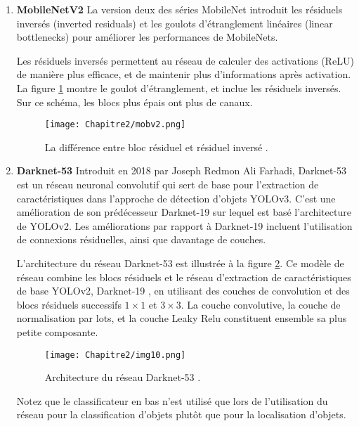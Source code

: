 \begin{enumerate}
\item \textbf{MobileNetV2 } \cite{mobilenetv2}
La version deux des séries MobileNet introduit les résiduels inversés (inverted residuals) et les goulots d'étranglement linéaires (linear bottlenecks) pour améliorer les performances de MobileNets. 

Les résiduels inversés permettent au réseau de calculer des activations (ReLU) de manière plus efficace, et de maintenir plus d’informations après activation. La figure \ref{mobv2} montre le goulot d'étranglement, et inclue les résiduels inversés. Sur ce schéma, les blocs plus épais ont plus de canaux. 

\begin{figure}[H]
\centering
  \texttt{[image: Chapitre2/mobv2.png]} 
   \caption{La différence entre bloc résiduel \cite{mobilenet}
et résiduel inversé \cite{mobilenetv2}.}
   \label{mobv2}
 \end{figure}
 
\item \textbf{Darknet-53} \cite{yolov3_paper}
Introduit en 2018 par Joseph Redmon Ali Farhadi, Darknet-53  est un réseau neuronal convolutif qui sert de base pour l'extraction de caractéristiques dans l'approche de détection d'objets YOLOv3. C'est une amélioration de son prédécesseur Darknet-19 sur lequel est basé l'architecture de YOLOv2.
Les améliorations par rapport à Darknet-19 incluent l'utilisation de connexions résiduelles, ainsi que davantage de couches.

L'architecture du réseau Darknet-53 est illustrée à la figure \ref{img10}. Ce modèle de réseau combine les blocs résiduels et le réseau d'extraction de caractéristiques de base YOLOv2, Darknet-19 \cite{yolov3_paper}, en utilisant des couches de convolution et des blocs résiduels successifs $1\times 1$ et $3\times 3$. La couche convolutive, la couche de normalisation par lots, et la couche Leaky Relu constituent ensemble sa plus petite composante.

           \begin{figure}[H]
                \centering
                \texttt{[image: Chapitre2/img10.png]}
                \caption{Architecture du réseau Darknet-53 \cite{yolov3_paper}.}
                \label{img10}
                \end{figure}

Notez que le classificateur en bas n'est utilisé que lors de l'utilisation du réseau pour la classification d'objets plutôt que pour la localisation d'objets. 

\end{enumerate}


